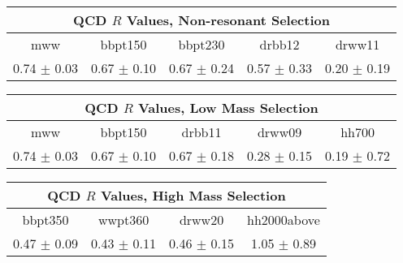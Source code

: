 \begin{tabular}{c|c|c|c|c}
\hline\hline
\multicolumn{5}{c}{QCD $R$ Values, Non-resonant Selection}\\\hline\hline
mww     & bbpt150       & bbpt230       & drbb12        & drww11        \\\hline
0.74 $\pm$ 0.03 	& 0.67 $\pm$ 0.10 	& 0.67 $\pm$ 0.24 	& 0.57 $\pm$ 0.33 	& 0.20 $\pm$ 0.19	\\\hline 
\end{tabular}

\begin{tabular}{c|c|c|c|c}
\multicolumn{5}{c}{QCD $R$ Values, Low Mass Selection}\\\hline\hline
mww     & bbpt150       & drbb11        & drww09        & hh700 \\\hline
0.74 $\pm$ 0.03 	& 0.67 $\pm$ 0.10 	& 0.67 $\pm$ 0.18 	& 0.28 $\pm$ 0.15 	& 0.19 $\pm$ 0.72	\\\hline 
\hline\hline
\end{tabular}

\begin{tabular}{c|c|c|c}
\multicolumn{4}{c}{QCD $R$ Values, High Mass Selection}\\\hline\hline
bbpt350         & wwpt360       & drww20        & hh2000above   \\\hline
0.47 $\pm$ 0.09 	& 0.43 $\pm$ 0.11 	& 0.46 $\pm$ 0.15 	& 1.05 $\pm$ 0.89	\\\hline 
\hline\hline
\end{tabular}

